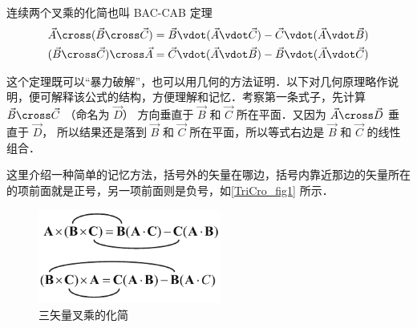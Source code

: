 

连续两个叉乘的化简也叫 BAC-CAB 定理
\begin{gather}
\vec A \cross (\vec B \cross \vec C) = \vec B \vdot (\vec A \vdot \vec C) - \vec C \vdot (\vec A \vdot \vec B)\\
(\vec B \cross \vec C) \cross \vec A = \vec C \vdot (\vec A \vdot \vec B) - \vec B \vdot (\vec A \vdot \vec C)
\end{gather}

这个定理既可以“暴力破解”，也可以用几何的方法证明．以下对几何原理略作说明，便可解释该公式的结构，方便理解和记忆．考察第一条式子，先计算 $\vec B \cross \vec C$ （命名为 $\vec D$） 方向垂直于 $\vec B$ 和 $\vec C$ 所在平面．又因为 $\vec A \cross \vec D$ 垂直于 $\vec D$， 所以结果还是落到 $\vec B$ 和 $\vec C$ 所在平面，所以等式右边是 $\vec B$ 和 $\vec C$ 的线性组合．

这里介绍一种简单的记忆方法，括号外的矢量在哪边，括号内靠近那边的矢量所在的项前面就是正号，另一项前面则是负号，如\autoref{TriCro_fig1} 所示．

\begin{figure}[ht]
\centering
\includegraphics[width=6cm]{./figures/TriCro.pdf}
\caption{三矢量叉乘的化简}\label{TriCro_fig1}
\end{figure}
 
